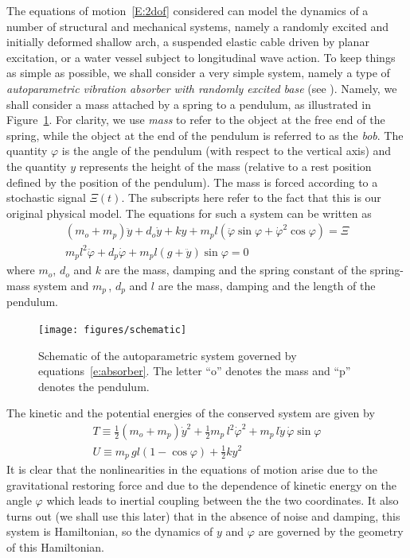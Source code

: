 The equations of motion~\eqref{E:2dof} considered can model the dynamics of a number of structural and mechanical systems, namely a randomly excited and initially deformed shallow arch, a suspended elastic cable driven by planar excitation, or a water vessel subject to longitudinal wave action. To keep things as simple as possible, we shall consider a very simple system, namely a type of \emph{autoparametric vibration absorber with randomly excited base} (see \citep{hatwal83:_forced_nonlin_oscil_of_autop_1}). Namely, we shall consider a mass attached by a spring to a pendulum, as illustrated in Figure~\ref{F:ap schematic}. For clarity, we use \emph{mass} to refer to the object at the free end of the spring, while the object at the end of the pendulum is referred to as the \emph{bob}. The quantity $\varphi$ is the angle of the pendulum (with respect to the vertical axis) and the quantity $y$ represents the height of the mass (relative to a rest position defined by the position of the pendulum). The mass is forced according to a stochastic signal $\Xi(t)$. The subscripts here refer to the fact that this is our original physical model. The equations for such a system can be written as
\begin{equation}
\label{e:absorber}
\begin{gathered}
(m_o + m_p) \ddot y + d_o \dot y + k y + m_p l (\ddot \varphi \sin \varphi + {\dot \varphi}^2 \cos \varphi) = \Xi\\
m_p l^2 \ddot \varphi + d_p \dot\varphi + m_p l (g + \ddot y) \sin \varphi = 0
\end{gathered}
\end{equation}
where $m_o$, $d_o$ and $k$ are the mass, damping and the spring constant of the spring-mass system and $m_p \,$, $d_p$ and $l$ are the mass, damping and the length of the pendulum.
\begin{figure}
\begin{center}
\texttt{[image: figures/schematic]}
\caption{Schematic of the autoparametric system governed by equations~\eqref{e:absorber}. The letter ``o'' denotes the mass and ``p'' denotes the pendulum.}
\label{F:ap schematic}
\end{center}
\end{figure}
The kinetic and the potential energies of the conserved system are given by
\begin{gather*}
T \equiv \frac12 (m_o + m_p){\dot y}^2 + \frac12 m_p \, l^2 {\dot \varphi}^2 + m_p \, l \dot y \, \dot \varphi \sin \varphi\\
U \equiv m_p \, g l ( 1 -\cos \varphi) + \frac12 k y^2
\end{gather*}
It is clear that the nonlinearities in the equations of motion arise due to the gravitational restoring force and due to the dependence of kinetic energy on the angle $\varphi$ which leads to inertial coupling between the the two coordinates. It also turns out (we shall use this later) that in the absence of noise and damping, this system is Hamiltonian, so the dynamics of $y$ and $\varphi$ are governed by the geometry of this Hamiltonian.


